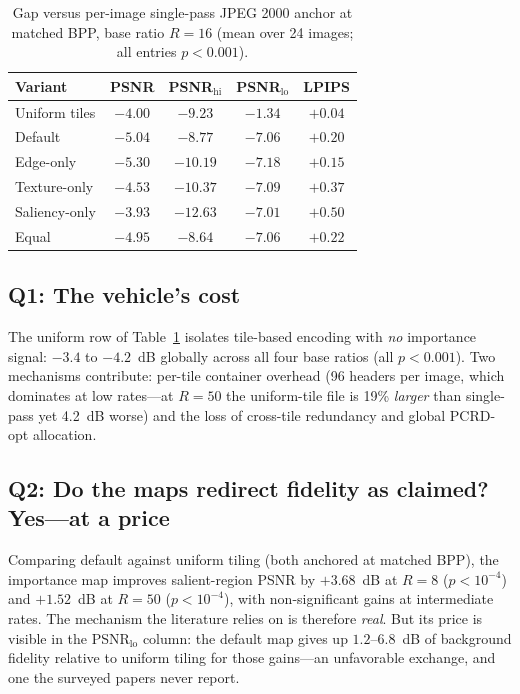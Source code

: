 \documentclass[conference]{IEEEtran}
\begin{document}
\begin{table}[t]
\caption{Gap versus per-image single-pass JPEG 2000 anchor at matched BPP,
base ratio $R{=}16$ (mean over 24 images; all entries $p{<}0.001$).}
\label{tab:gaps}
\begin{center}
\small
\begin{tabular}{lcccc}
\toprule
\textbf{Variant} & \textbf{PSNR} & \textbf{PSNR$_{\text{hi}}$} & \textbf{PSNR$_{\text{lo}}$} & \textbf{LPIPS} \\
\midrule
Uniform tiles & $-4.00$ & $-9.23$ & $-1.34$ & $+0.04$ \\
Default & $-5.04$ & $-8.77$ & $-7.06$ & $+0.20$ \\
Edge-only & $-5.30$ & $-10.19$ & $-7.18$ & $+0.15$ \\
Texture-only & $-4.53$ & $-10.37$ & $-7.09$ & $+0.37$ \\
Saliency-only & $-3.93$ & $-12.63$ & $-7.01$ & $+0.50$ \\
Equal & $-4.95$ & $-8.64$ & $-7.06$ & $+0.22$ \\
\bottomrule
\end{tabular}
\end{center}
\end{table}

\subsection{Q1: The vehicle's cost}
The uniform row of Table~\ref{tab:gaps} isolates tile-based encoding with
\emph{no} importance signal: $-3.4$ to $-4.2$~dB globally across all four
base ratios (all $p{<}0.001$). Two mechanisms contribute: per-tile container
overhead (96 headers per image, which dominates at low rates---at $R{=}50$
the uniform-tile file is 19\% \emph{larger} than single-pass yet 4.2~dB
worse) and the loss of cross-tile redundancy and global PCRD-opt
allocation.

\subsection{Q2: Do the maps redirect fidelity as claimed? Yes---at a price}
Comparing default against uniform tiling (both anchored at matched BPP), the
importance map improves salient-region PSNR by $+3.68$~dB at $R{=}8$
($p{<}10^{-4}$) and $+1.52$~dB at $R{=}50$ ($p{<}10^{-4}$), with
non-significant gains at intermediate rates. The mechanism the literature
relies on is therefore \emph{real}. But its price is visible in the
PSNR$_{\text{lo}}$ column: the default map gives up $1.2$--$6.8$~dB of
background fidelity relative to uniform tiling for those gains---an
unfavorable exchange, and one the surveyed papers never report.
\end{document}
